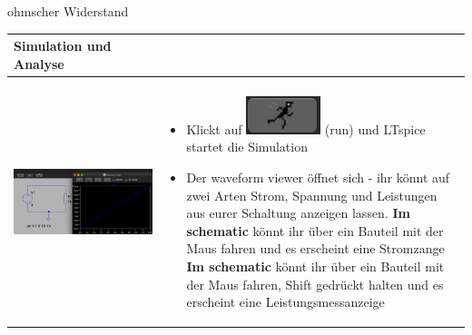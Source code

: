 \begin{frame}[t]{ohmscher Widerstand}

  \begin{spacing}{0.9} \begin{tiny}
      \begin{table}[h!]
        \begin{tabular}{p{5cm} p{5cm}}
          \hline
          \textbf{Simulation und Analyse} & \\
          \hline                            \\
          \begin{minipage}{.5\textwidth}
            \includegraphics[width=\linewidth]{pictures/analysis.png}
          \end{minipage}
                                          &
          \begin{minipage}{.5\textwidth}
            \begin{itemize}
              \item Klickt auf \includegraphics[scale=0.3]{pictures/run.png} (run) und LTspice startet die Simulation
              \item Der waveform viewer öffnet sich - ihr könnt auf zwei Arten Strom, Spannung und Leistungen aus eurer Schaltung anzeigen lassen. \newline\newline
                    \textbf{Im schematic} könnt ihr über ein Bauteil mit der Maus fahren und es erscheint eine Stromzange\newline\newline
                    \textbf{Im schematic} könnt ihr über ein Bauteil mit der Maus fahren, Shift gedrückt halten und es erscheint eine Leistungsmessanzeige\newline\newline

\end{itemize}
\end{minipage}
\end{tabular}
\end{table}
\end{tiny}
\end{spacing}
\end{frame}
